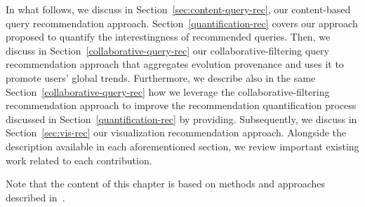 In what follows, we discuss in Section~\ref{sec:content-query-rec}, our content-based query recommendation approach. Section~\ref{quantification-rec} covers our approach proposed to quantify the interestingness of recommended queries. 
Then, we discuss in Section~\ref{collaborative-query-rec} our collaborative-filtering query recommendation approach that aggregates evolution provenance and uses it to promote users' global trends.
Furthermore, we describe also in the same Section~\ref{collaborative-query-rec} how we leverage the collaborative-filtering recommendation approach to improve the recommendation quantification process discussed in Section~\ref{quantification-rec} by providing.
Subsequently, we discuss in Section~\ref{sec:vis-rec} our visualization recommendation approach. %
Alongside the description available in each aforementioned section, we review important existing work related to each contribution.

Note that the content of this chapter is based on methods and approaches described in~\cite{Houssem:17:tapp,BHBK18:Demo,Houssem:19:adbis,Houssem:19:IS}.


